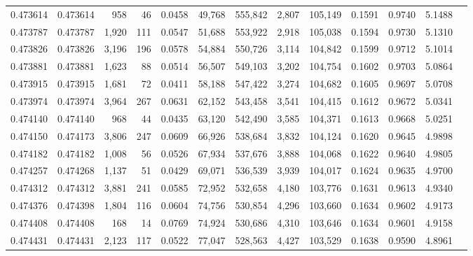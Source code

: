 \begin{tabular}{rrrrrrrrrrrrr}
0.473614 & 0.473614 &   958 &    46 &                                     0.0458 &  49,768 & 555,842 &   2,807 & 105,149 & 0.1591 & 0.9740 & 5.1488 \\
0.473787 & 0.473787 & 1,920 &   111 &                                     0.0547 &  51,688 & 553,922 &   2,918 & 105,038 & 0.1594 & 0.9730 & 5.1310 \\
0.473826 & 0.473826 & 3,196 &   196 &                                     0.0578 &  54,884 & 550,726 &   3,114 & 104,842 & 0.1599 & 0.9712 & 5.1014 \\
0.473881 & 0.473881 & 1,623 &    88 &                                     0.0514 &  56,507 & 549,103 &   3,202 & 104,754 & 0.1602 & 0.9703 & 5.0864 \\
0.473915 & 0.473915 & 1,681 &    72 &                                     0.0411 &  58,188 & 547,422 &   3,274 & 104,682 & 0.1605 & 0.9697 & 5.0708 \\
0.473974 & 0.473974 & 3,964 &   267 &                                     0.0631 &  62,152 & 543,458 &   3,541 & 104,415 & 0.1612 & 0.9672 & 5.0341 \\
0.474140 & 0.474140 &   968 &    44 &                                     0.0435 &  63,120 & 542,490 &   3,585 & 104,371 & 0.1613 & 0.9668 & 5.0251 \\
0.474150 & 0.474173 & 3,806 &   247 &                                     0.0609 &  66,926 & 538,684 &   3,832 & 104,124 & 0.1620 & 0.9645 & 4.9898 \\
0.474182 & 0.474182 & 1,008 &    56 &                                     0.0526 &  67,934 & 537,676 &   3,888 & 104,068 & 0.1622 & 0.9640 & 4.9805 \\
0.474257 & 0.474268 & 1,137 &    51 &                                     0.0429 &  69,071 & 536,539 &   3,939 & 104,017 & 0.1624 & 0.9635 & 4.9700 \\
0.474312 & 0.474312 & 3,881 &   241 &                                     0.0585 &  72,952 & 532,658 &   4,180 & 103,776 & 0.1631 & 0.9613 & 4.9340 \\
0.474376 & 0.474398 & 1,804 &   116 &                                     0.0604 &  74,756 & 530,854 &   4,296 & 103,660 & 0.1634 & 0.9602 & 4.9173 \\
0.474408 & 0.474408 &   168 &    14 &                                     0.0769 &  74,924 & 530,686 &   4,310 & 103,646 & 0.1634 & 0.9601 & 4.9158 \\
0.474431 & 0.474431 & 2,123 &   117 &                                     0.0522 &  77,047 & 528,563 &   4,427 & 103,529 & 0.1638 & 0.9590 & 4.8961 \\

\end{tabular}
